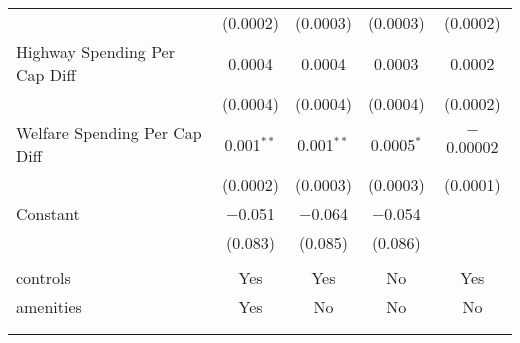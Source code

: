 \begin{table}[!htbp]
\begin{tabular}{@{\extracolsep{5pt}}lcccc}
  & (0.0002) & (0.0003) & (0.0003) & (0.0002) \\ 
  Highway Spending Per Cap Diff & 0.0004 & 0.0004 & 0.0003 & 0.0002 \\ 
  & (0.0004) & (0.0004) & (0.0004) & (0.0002) \\ 
  Welfare Spending Per Cap Diff & 0.001$^{**}$ & 0.001$^{**}$ & 0.0005$^{*}$ & $-$0.00002 \\ 
  & (0.0002) & (0.0003) & (0.0003) & (0.0001) \\ 
  Constant & $-$0.051 & $-$0.064 & $-$0.054 &  \\ 
  & (0.083) & (0.085) & (0.086) &  \\ 
 \hline \\[-1.8ex] 
controls & Yes & Yes & No & Yes \\ 
amenities & Yes & No & No & No \\ 
\hline \\[-1.8ex] 
\hline 
\hline \\[-1.8ex] 
\end{tabular} 
\end{table} 
